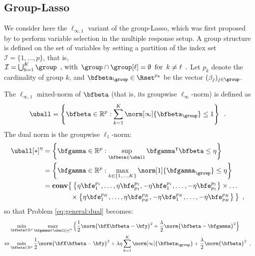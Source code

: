 \subsection{Group-Lasso}

We consider here the $\ell_{\infty,1}$ variant of the group-Lasso, which was
first proposed by \citet{Turlach05} to perform variable selection in the
multiple response setup.
%
A group structure is defined on
the set of variables by setting a partition of the index set
$\mathcal{I}=\{1,\ldots,p\}$, that is,
$
  \mathcal{I}=\bigcup_{k=1}^K\group \enspace,\, \text{with}\enspace 
  \group \cap \group[\ell]=\emptyset \enspace
  \text{for}\enspace k\neq\ell \enspace.
$
%
Let $p_k$ denote the cardinality of group $k$, and $\bfbeta_{\group} \in
\Rset^{p_k}$ be the vector $(\beta_j)_{j\in \group}$.
%


The $\ell_{\infty,1}$ mixed-norm of $\bfbeta$ (that is, its groupwise 
$\ell_\infty$-norm) is defined as
%
\begin{equation*}
  \uball = \left\{ 
    \bfbeta \in \mathbb{R}^p :\sum_{k=1}^K \norm[\infty]{\bfbeta_{\group}} \leq 1
  \right\}
  \enspace.
\end{equation*}
%
The dual norm is the groupwise $\ell_1$-norm:
%
\begin{align*}
  \uball[*]^\eta & = \left\{ \bfgamma \in \mathbb{R}^p :
\sup_{\bfbeta\in\uball} \bfgamma^\intercal\bfbeta \leq \eta \right\} \\
    & = \left\{ \bfgamma \in \mathbb{R}^p : \max_{k\in\{1,...,K\}}  \norm[1]{\bfgamma_{\group}} \leq \eta \right\} \\
    & = \mathbf{conv} \big\{ 
                        \left\{\eta\bfe^{p_1}_1, \ldots, \eta\bfe^{p_1}_{p_1},-\eta\bfe^{p_1}_1, \ldots, -\eta\bfe^{p_1}_{p_1} \right\} 
                        \times \ldots \\
    & \hspace*{4em} \times 
                        \left\{\eta\bfe^{p_K}_1, \ldots, \eta\bfe^{p_K}_{p_K},-\eta\bfe^{p_K}_1, \ldots, -\eta\bfe^{p_K}_{p_K} \right\} 
                      \big\}
  \enspace,
\end{align*}
so that Problem \eqref{eq:general:dual} becomes:
%
\begin{align*}
  & \min_{\bfbeta\in\mathbb{R}^p} \max_{\bfgamma \in \uball[*]^\eta}
      \Big\{ \frac{1}{2} \norm{\bfX \bfbeta - \bfy}^2 + \frac{\lambda}{2} \norm{\bfbeta - \bfgamma}^2 \Big\} \\
  \Leftrightarrow
    & \min_{\bfbeta\in\mathbb{R}^p}
      \frac{1}{2} \norm{\bfX \bfbeta - \bfy}^2 + \lambda \eta \sum_{k=1}^K \norm[\infty]{\bfbeta_{\group}} + \frac{\lambda}{2} \norm{\bfbeta}^2 
  \enspace,
\end{align*}
%

